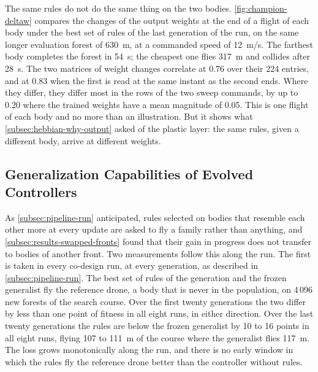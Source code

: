 The same rules do not do the same thing on the two bodies. \autoref{fig:champion-deltaw} compares the changes of the output weights at the end of a flight of each body under the best set of rules of the last generation of the run, on the same longer evaluation forest of 630~m, at a commanded speed of 12~m/s. The farthest body completes the forest in 54~s; the cheapest one flies 317~m and collides after 28~s. The two matrices of weight changes correlate at 0.76 over their 224 entries, and at 0.83 when the first is read at the same instant as the second ends. Where they differ, they differ most in the rows of the two sweep commands, by up to 0.20 where the trained weights have a mean magnitude of 0.05. This is one flight of each body and no more than an illustration. But it shows what \autoref{subsec:hebbian-why-output} asked of the plastic layer: the same rules, given a different body, arrive at different weights.

\subsection{Generalization Capabilities of Evolved Controllers}
\label{subsec:results-generality}

As \autoref{subsec:pipeline-run} anticipated, rules selected on bodies that resemble each other more at every update are asked to fly a family rather than anything, and \autoref{subsec:results-swapped-fronts} found that their gain in progress does not transfer to bodies of another front. Two measurements follow this along the run. The first is taken in every co-design run, at every generation, as described in \autoref{subsec:pipeline-run}. The best set of rules of the generation and the frozen generalist fly the reference drone, a body that is never in the population, on 4\,096 new forests of the search course. Over the first twenty generations the two differ by less than one point of fitness in all eight runs, in either direction. Over the last twenty generations the rules are below the frozen generalist by 10 to 16 points in all eight runs, flying 107 to 111~m of the course where the generalist flies 117~m. The loss grows monotonically along the run, and there is no early window in which the rules fly the reference drone better than the controller without rules.

